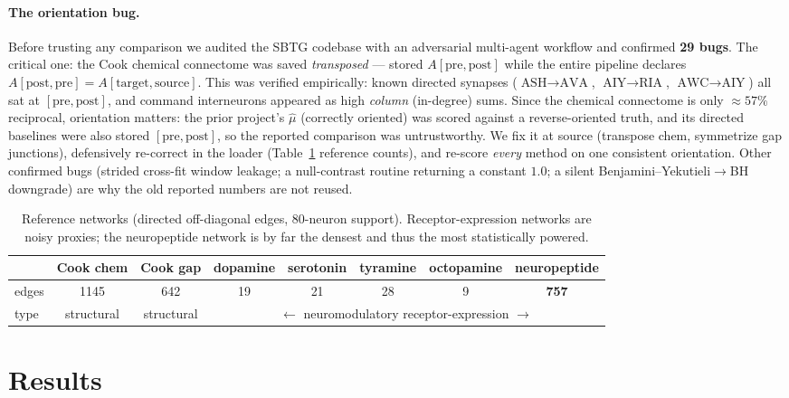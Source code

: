 \documentclass[11pt]{article}
\begin{document}
\paragraph{The orientation bug.} Before trusting any comparison we audited the SBTG codebase with an
adversarial multi-agent workflow and confirmed \textbf{29 bugs}. The critical one: the Cook chemical
connectome was saved \emph{transposed} --- stored $A[\text{pre},\text{post}]$ while the entire
pipeline declares $A[\text{post},\text{pre}]=A[\text{target},\text{source}]$. This was verified
empirically: known directed synapses ($\text{ASH}\!\to\!\text{AVA}$,
$\text{AIY}\!\to\!\text{RIA}$, $\text{AWC}\!\to\!\text{AIY}$) all sat at $[\text{pre},\text{post}]$,
and command interneurons appeared as high \emph{column} (in-degree) sums. Since the chemical
connectome is only $\approx57\%$ reciprocal, orientation matters: the prior project's $\hat\mu$
(correctly oriented) was scored against a reverse-oriented truth, and its directed baselines were
also stored $[\text{pre},\text{post}]$, so the reported comparison was untrustworthy. We fix it at
source (transpose chem, symmetrize gap junctions), defensively re-correct in the loader
(Table~\ref{tab:refs} reference counts), and re-score \emph{every} method on one consistent
orientation. Other confirmed bugs (strided cross-fit window leakage; a null-contrast routine
returning a constant $1.0$; a silent Benjamini--Yekutieli$\to$BH downgrade) are why the old reported
numbers are not reused.

\begin{table}[t]
\centering
\small
\caption{Reference networks (directed off-diagonal edges, 80-neuron support). Receptor-expression
networks are noisy proxies; the neuropeptide network is by far the densest and thus the most
statistically powered.}
\label{tab:refs}
\begin{tabular}{lccccccc}
\toprule
& Cook chem & Cook gap & dopamine & serotonin & tyramine & octopamine & neuropeptide \\
\midrule
edges & 1145 & 642 & 19 & 21 & 28 & 9 & \textbf{757} \\
type & structural & structural & \multicolumn{5}{c}{$\longleftarrow$ neuromodulatory receptor-expression $\longrightarrow$} \\
\bottomrule
\end{tabular}
\end{table}

\section{Results}
\label{sec:results}
\end{document}
